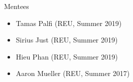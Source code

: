 \documentclass{resume} %
\begin{document}

\begin{rSection}{Mentees}

\begin{itemize}
\item Tamas Palfi (REU, Summer 2019) 
\item Sirius Just (REU, Summer 2019) 
\item Hieu Phan (REU, Summer 2019) 
\item Aaron Mueller (REU, Summer 2017) 
\end{itemize}

\end{rSection}






\end{document}
